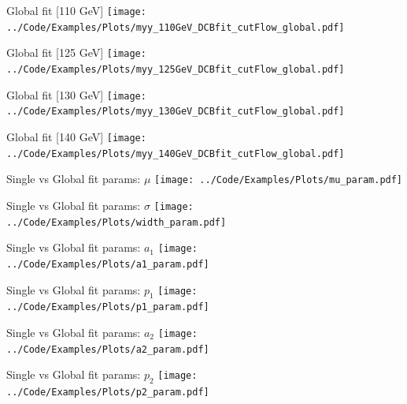 \documentclass[10pt,UKenglish, leqno, xcolor = dvipsnames]{beamer}
\begin{document}
		\begin{frame}{Global fit [110 GeV]}
			\vfill
			\texttt{[image: ../Code/Examples/Plots/myy\_110GeV\_DCBfit\_cutFlow\_global.pdf]}
			\vfill
		\end{frame}
	
		\begin{frame}{Global fit [125 GeV]}
			\vfill
			\texttt{[image: ../Code/Examples/Plots/myy\_125GeV\_DCBfit\_cutFlow\_global.pdf]}
			\vfill
		\end{frame}
	
		\begin{frame}{Global fit [130 GeV]}
			\vfill
			\texttt{[image: ../Code/Examples/Plots/myy\_130GeV\_DCBfit\_cutFlow\_global.pdf]}
			\vfill
		\end{frame}
	
		\begin{frame}{Global fit [140 GeV]}
			\vfill
			\texttt{[image: ../Code/Examples/Plots/myy\_140GeV\_DCBfit\_cutFlow\_global.pdf]}
			\vfill
		\end{frame}
		
		\begin{frame}{Single vs Global fit params: $\mu$}
			\vfill
			\texttt{[image: ../Code/Examples/Plots/mu\_param.pdf]}
			\vfill
		\end{frame}

		\begin{frame}{Single vs Global fit params: $\sigma$}
			\vfill
			\texttt{[image: ../Code/Examples/Plots/width\_param.pdf]}
			\vfill
		\end{frame}
		
		\begin{frame}{Single vs Global fit params: $a_1$}
			\vfill
			\texttt{[image: ../Code/Examples/Plots/a1\_param.pdf]}
			\vfill
		\end{frame}
	
		\begin{frame}{Single vs Global fit params: $p_1$}
			\vfill
			\texttt{[image: ../Code/Examples/Plots/p1\_param.pdf]}
			\vfill
		\end{frame}
	
		\begin{frame}{Single vs Global fit params: $a_2$}
			\vfill
			\texttt{[image: ../Code/Examples/Plots/a2\_param.pdf]}
			\vfill
		\end{frame}
	
		\begin{frame}{Single vs Global fit params: $p_2$}
			\vfill
			\texttt{[image: ../Code/Examples/Plots/p2\_param.pdf]}
			\vfill
		\end{frame}
	
\end{document}
